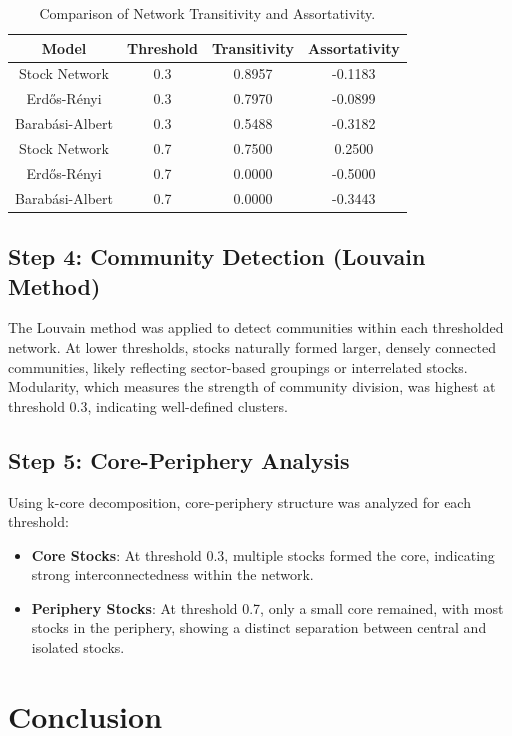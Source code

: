 \documentclass[12pt]{article}
\begin{document}
\begin{table}[H]
    \centering
    \begin{tabular}{|c|c|c|c|}
        \hline
        Model & Threshold & Transitivity & Assortativity \\
        \hline
        Stock Network & 0.3 & 0.8957 & -0.1183 \\
        Erdős-Rényi & 0.3 & 0.7970 & -0.0899 \\
        Barabási-Albert & 0.3 & 0.5488 & -0.3182 \\
        Stock Network & 0.7 & 0.7500 & 0.2500 \\
        Erdős-Rényi & 0.7 & 0.0000 & -0.5000 \\
        Barabási-Albert & 0.7 & 0.0000 & -0.3443 \\
        \hline
    \end{tabular}
    \caption{Comparison of Network Transitivity and Assortativity.}
\end{table}

\subsection{Step 4: Community Detection (Louvain Method)}
The Louvain method was applied to detect communities within each thresholded network. At lower thresholds, stocks naturally formed larger, densely connected communities, likely reflecting sector-based groupings or interrelated stocks. Modularity, which measures the strength of community division, was highest at threshold 0.3, indicating well-defined clusters.

\subsection{Step 5: Core-Periphery Analysis}
Using k-core decomposition, core-periphery structure was analyzed for each threshold:
\begin{itemize}
    \item \textbf{Core Stocks}: At threshold 0.3, multiple stocks formed the core, indicating strong interconnectedness within the network.
    \item \textbf{Periphery Stocks}: At threshold 0.7, only a small core remained, with most stocks in the periphery, showing a distinct separation between central and isolated stocks.
\end{itemize}

\section{Conclusion}
\end{document}
